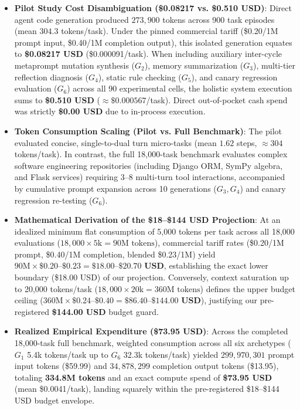 \documentclass{article}
\begin{document}
\begin{itemize}
    \item \textbf{Pilot Study Cost Disambiguation (\$0.08217 vs. \$0.510 USD)}: Direct agent code generation produced $273{,}900$ tokens across 900 task episodes (mean $304.3$ tokens/task). Under the pinned commercial tariff (\$0.20/1M prompt input, \$0.40/1M completion output), this isolated generation equates to \textbf{\$0.08217 USD} (\$0.000091/task). When including auxiliary inter-cycle metaprompt mutation synthesis ($G_2$), memory summarization ($G_3$), multi-tier reflection diagnosis ($G_4$), static rule checking ($G_5$), and canary regression evaluation ($G_6$) across all 90 experimental cells, the holistic system execution sums to \textbf{\$0.510 USD} ($\approx \$0.000567$/task). Direct out-of-pocket cash spend was strictly \textbf{\$0.00 USD} due to in-process execution.
    \item \textbf{Token Consumption Scaling (Pilot vs. Full Benchmark)}: The pilot evaluated concise, single-to-dual turn micro-tasks (mean $1.62$ steps, $\approx 304$ tokens/task). In contrast, the full 18,000-task benchmark evaluates complex software engineering repositories (including Django ORM, SymPy algebra, and Flask services) requiring $3$--$8$ multi-turn tool interactions, accompanied by cumulative prompt expansion across 10 generations ($G_3, G_4$) and canary regression re-testing ($G_6$).
    \item \textbf{Mathematical Derivation of the \$18--\$144 USD Projection}: At an idealized minimum flat consumption of 5,000 tokens per task across all 18,000 evaluations ($18{,}000 \times 5\text{k} = 90\text{M tokens}$), commercial tariff rates (\$0.20/1M prompt, \$0.40/1M completion, blended \$0.23/1M) yield $90\text{M} \times \$0.20\text{--}\$0.23 = \mathbf{\$18.00\text{--}\$20.70\text{ USD}}$, establishing the exact lower boundary (\$18.00 USD) of our projection. Conversely, context saturation up to 20,000 tokens/task ($18{,}000 \times 20\text{k} = 360\text{M tokens}$) defines the upper budget ceiling ($360\text{M} \times \$0.24\text{--}\$0.40 = \mathbf{\$86.40\text{--}\$144.00\text{ USD}}$), justifying our pre-registered \textbf{\$144.00 USD} budget guard.
    \item \textbf{Realized Empirical Expenditure (\$73.95 USD)}: Across the completed 18,000-task full benchmark, weighted consumption across all six archetypes ($G_1$ 5.4k tokens/task up to $G_6$ 32.3k tokens/task) yielded $299{,}970{,}301$ prompt input tokens (\$59.99) and $34{,}878{,}299$ completion output tokens (\$13.95), totaling \textbf{334.8M tokens} and an exact compute spend of \textbf{\$73.95 USD} (mean \$0.0041/task), landing squarely within the pre-registered \$18--\$144 USD budget envelope.
\end{itemize}
\end{document}
